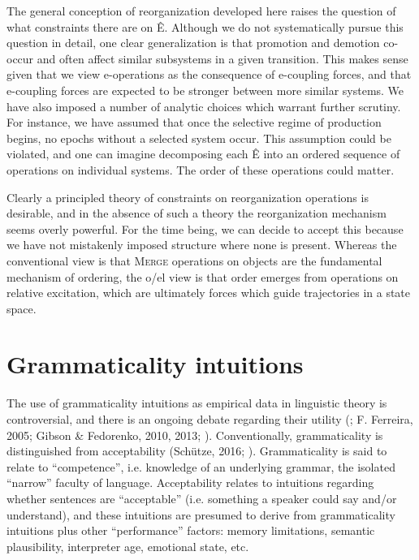   The general conception of reorganization developed here raises the question of what constraints there are on Ê. Although we do not systematically pursue this question in detail, one clear generalization is that promotion and demotion co-occur and often affect similar subsystems in a given transition. This makes sense given that we view e-operations as the consequence of e-coupling forces, and that e-coupling forces are expected to be stronger between more similar systems. We have also imposed a number of analytic choices which warrant further scrutiny. For instance, we have assumed that once the selective regime of production begins, no epochs without a selected system occur. This assumption could be violated, and one can imagine decomposing each Ê into an ordered sequence of operations on individual systems. The order of these operations could matter.

  Clearly a principled theory of constraints on reorganization operations is desirable, and in the absence of such a theory the reorganization mechanism seems overly powerful. For the time being, we can decide to accept this because we have not mistakenly imposed structure where none is present. Whereas the conventional view is that \textsc{Merge} operations on objects are the fundamental mechanism of ordering, the o/el view is that order emerges from operations on relative excitation, which are ultimately forces which guide trajectories in a state space.

\chapter{Grammaticality intuitions}

The use of grammaticality intuitions as empirical data in linguistic theory is controversial, and there is an ongoing debate regarding their utility (\citealt{CulicoverJackendoff2010}; F. Ferreira, 2005; Gibson \& Fedorenko, 2010, 2013; \citealt{SprouseAlmeida2013}). Conventionally, grammaticality is distinguished from acceptability (Schütze, 2016; \citealt{Sprouse2007}). Grammaticality is said to relate to “competence”, i.e. knowledge of an underlying grammar, the isolated “narrow” faculty of language. Acceptability relates to intuitions regarding whether sentences are “acceptable” (i.e. something a speaker could say and/or understand), and these intuitions are presumed to derive from grammaticality intuitions plus other “performance” factors: memory limitations, semantic plausibility, interpreter age, emotional state, etc. 

